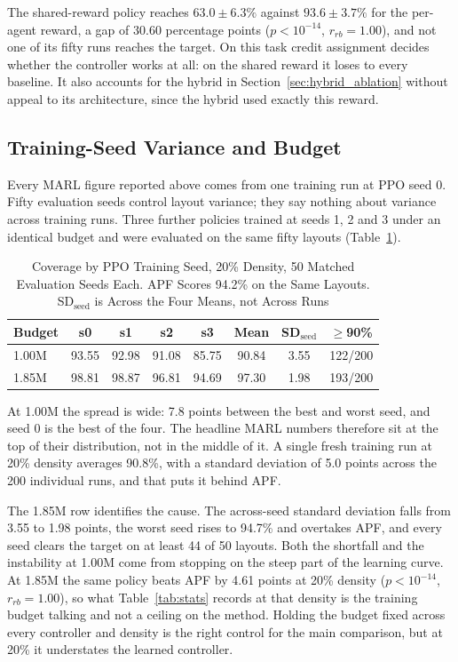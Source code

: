 \documentclass[a4paper, 10pt, conference]{ieeeconf}
\begin{document}
The shared-reward policy reaches $63.0\pm6.3\%$ against $93.6\pm3.7\%$
for the per-agent reward, a gap of $30.60$ percentage points
($p<10^{-14}$, $r_{rb}=1.00$), and not one of its fifty runs reaches
the target. On this task credit assignment decides whether the
controller works at all: on the shared reward it loses to every
baseline. It also accounts for the hybrid in
Section~\ref{sec:hybrid_ablation} without appeal to its architecture,
since the hybrid used exactly this reward.

\subsection{Training-Seed Variance and Budget}\label{sec:seedvar}

Every MARL figure reported above comes from one training run at PPO
seed 0. Fifty evaluation seeds control layout variance; they say
nothing about variance across training runs. Three further policies
trained at seeds 1, 2 and 3 under an identical budget and were
evaluated on the same fifty layouts (Table~\ref{tab:seedvar}).

\begin{table}[htb]
\centering
\caption{Coverage by PPO Training Seed, 20\% Density, 50 Matched
Evaluation Seeds Each. APF Scores 94.2\% on the Same Layouts.
SD$_{\text{seed}}$ is Across the Four Means, not Across Runs}
\label{tab:seedvar}
\scriptsize
\setlength{\tabcolsep}{2pt}
\begin{tabular}{lccccccc}
\toprule
\textbf{Budget} & \textbf{s0} & \textbf{s1} & \textbf{s2} &
\textbf{s3} & \textbf{Mean} & \textbf{SD$_{\text{seed}}$} &
\textbf{$\geq$90\%} \\
\midrule
1.00M & 93.55 & 92.98 & 91.08 & 85.75 & 90.84 & 3.55 & 122/200 \\
1.85M & 98.81 & 98.87 & 96.81 & 94.69 & 97.30 & 1.98 & 193/200 \\
\bottomrule
\end{tabular}
\end{table}

At 1.00M the spread is wide: 7.8 points between the best and worst
seed, and seed 0 is the best of the four. The headline MARL numbers
therefore sit at the top of their distribution, not in the middle of
it. A single fresh training run at 20\% density averages 90.8\%, with
a standard deviation of 5.0 points across the 200 individual runs, and
that puts it behind APF.

The 1.85M row identifies the cause. The across-seed standard deviation
falls from 3.55 to 1.98 points, the worst seed rises to 94.7\% and
overtakes APF, and every seed clears the target on at least 44 of 50
layouts. Both the shortfall and the instability at 1.00M come from
stopping on the steep part of the learning curve. At 1.85M the same
policy beats APF by 4.61 points at 20\% density ($p<10^{-14}$,
$r_{rb}=1.00$), so what Table~\ref{tab:stats} records at that density
is the training budget talking and not a ceiling on the method.
Holding the budget fixed across every controller and density is the
right control for the main comparison, but at 20\% it understates the
learned controller.
\end{document}

